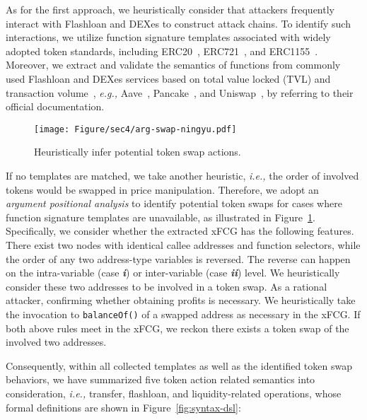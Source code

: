 As for the first approach, we heuristically consider that attackers frequently interact with Flashloan and DEXes to construct attack chains. To identify such interactions, we utilize function signature templates associated with widely adopted token standards, including ERC20~\cite{erc20}, ERC721~\cite{erc721}, and ERC1155~\cite{erc1155}. Moreover, we extract and validate the semantics of functions from commonly used Flashloan and DEXes services based on total value locked (TVL) and transaction volume~\cite{defillama}, \textit{e.g.,} Aave~\cite{aave}, Pancake~\cite{pancakeswap}, and Uniswap~\cite{uniswap}, by referring to their official documentation.



\begin{figure}[t] 
\centering
\texttt{[image: Figure/sec4/arg-swap-ningyu.pdf]} 
\vspace{-0.2in}
\caption{Heuristically infer potential token swap actions.} 
\vspace{-0.1in}
\label{fig:pswap} 
\end{figure}


If no templates are matched, we take another heuristic, \textit{i.e.,} the order of involved tokens would be swapped in price manipulation. Therefore, we adopt an \textit{argument positional analysis} to identify potential token swaps for cases where function signature templates are unavailable, as illustrated in Figure~\ref{fig:pswap}.
Specifically, we consider whether the extracted xFCG has the following features.
There exist two nodes with identical callee addresses and function selectors, while the order of any two address-type variables is reversed. The reverse can happen on the intra-variable (case \textbf{\textit{i}}) or inter-variable (case \textbf{\textit{ii}}) level. We heuristically consider these two addresses to be involved in a token swap.
As a rational attacker, confirming whether obtaining profits is necessary.
We heuristically take the invocation to \texttt{balanceOf()} of a swapped address as necessary in the xFCG.
If both above rules meet in the xFCG, we reckon there exists a token swap of the involved two addresses.

Consequently, within all collected templates as well as the identified token swap behaviors, we have summarized five token action related semantics into consideration, \textit{i.e.,} transfer, flashloan, and liquidity-related operations, whose formal definitions are shown in Figure~\ref{fig:syntax-dsl}:

